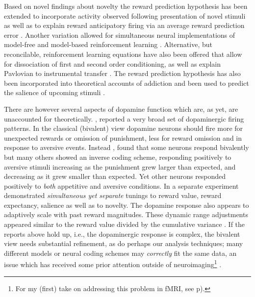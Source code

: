 \documentclass[doc,12pt]{apa}        %
\begin{document}
Based on novel findings about novelty \cite{Bunzeck:2006p5319, Blatter:2006p6372, GuitartMasip:2010p7244} the reward prediction hypothesis has been extended to incorporate activity observed following presentation of novel stimuli \cite{Kakade:2002p6414} as well as to explain reward anticipatory firing via an average reward prediction error \cite{Knutson:2007p1687}. Another variation allowed for simultaneous neural implementations of model-free and model-based reinforcement learning \cite{Smith:2006p7627, Daw:2011p7995}. Alternative, but reconcilable, reinforcement learning equations have also been offered that allow for dissociation of first and second order conditioning, as well as explain Pavlovian to instrumental transfer \cite{OReilly:2007p827}. The reward prediction hypothesis has also been incorporated into theoretical accounts of addiction \cite{Redish:2004p2531} and been used to predict the salience of upcoming stimuli \cite{Behrens:2007p8839}.   

There are however several aspects of dopamine function which are, as yet, are unaccounted for theoretically.  , reported a very broad set of dopaminergic firing patterns. In the classical (bivalent) view dopamine neurons should fire more for unexpected rewards or omission of punishment, less for reward omission and in response to aversive events.   Instead , found that some neurons respond bivalently but many others showed an inverse coding scheme, responding positively to aversive stimuli increasing as the punishment grew larger than expected, and decreasing as it grew smaller than expected.  Yet other neurons responded positively to \emph{both} appetitive and aversive conditions.  In a separate experiment  demonstrated \emph{simultaneous yet separate} tunings to reward value, reward expectancy, salience as well as to novelty.   The dopamine response also appears to adaptively scale with past reward magnitudes.  These dynamic range adjustments appeared similar to the reward value divided by the cumulative variance \cite{Tobler:2005p6373}.  If the reports above hold up, i.e., the dopaminergic response is complex, the bivalent view needs substantial refinement, as do perhaps our analysis techniques; many different models or neural coding schemes may \emph{correctly} fit the same data, an issue which has received some prior attention outside of neuroimaging\footnote{
    For my (first) take on addressing this problem in fMRI, see p\pageref{subsub:tomany}).
} \cite{Chamberlin:1965p8873}.
\end{document}
